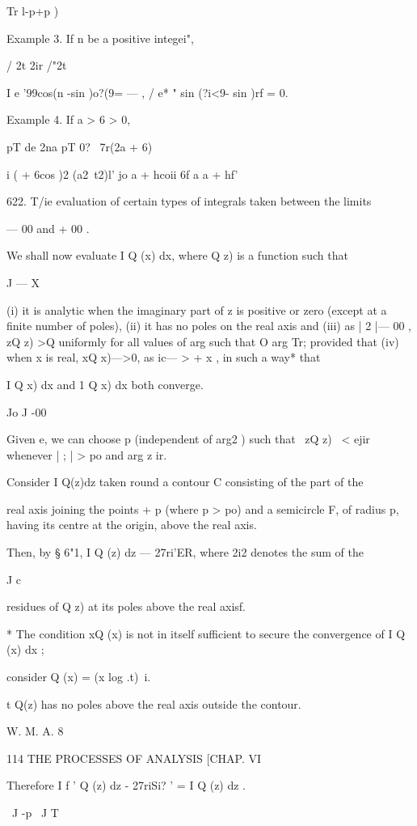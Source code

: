 {Tr l-p+p )

Example 3. If n be a positive integei",

/ 2t 2ir /"2t

I e '99cos(n -sin )o?(9= — , / e* " sin (?i<9- sin )rf = 0.

Example 4. If a > 6 > 0,

pT de 2na pT 0? \ 7r(2a + 6)

i ( + 6cos )2 (a2\ t2)l' jo a + hcoii 6f a a + hf'

622. T/ie evaluation of certain types of integrals taken between the
limits

— 00 and + 00 .

We shall now evaluate I Q (x) dx, where Q z) is a function such that

J — X

(i) it is analytic when the imaginary part of z is positive or zero
(except at a finite number of poles), (ii) it has no poles on the real
axis and (iii) as | 2 |— 00 , zQ z) >Q uniformly for all values of arg
such that O arg Tr; provided that (iv) when x is real, xQ x)—>0, as
ic— > + x , in such a way* that

I Q x) dx and 1 Q x) dx both converge.

Jo J -00

Given e, we can choose p (independent of arg2 ) such that \ zQ z) \ <
ejir whenever | ; | > po and arg z ir.

Consider I Q(z)dz taken round a contour C consisting of the part of
the

real axis joining the points + p (where p > po) and a semicircle F, of
radius p, having its centre at the origin, above the real axis.

Then, by § 6"1, I Q (z) dz — 27ri'ER, where 2i2 denotes the sum of the

J c

residues of Q z) at its poles above the real axisf.

* The condition xQ (x) is not in itself sufficient to secure the
convergence of I Q (x) dx ;

consider Q (x) = (x log .t)~i.

t Q(z) has no poles above the real axis outside the contour.

W. M. A. 8



114 THE PROCESSES OF ANALYSIS [CHAP. VI

Therefore I f ' Q (z) dz - 27riSi? ' = I Q (z) dz .

\ J -p \ J T

}
